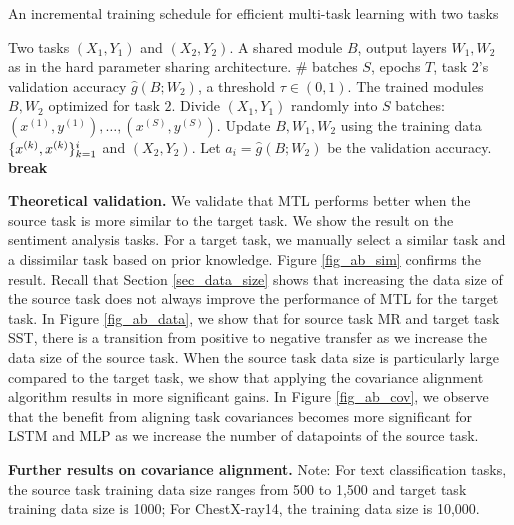 \begin{algorithm}[!h]
	\caption{An incremental training schedule for efficient multi-task learning with two tasks}
	\label{alg_inc_train}
	\begin{algorithmic}[1]
		\Input Two tasks $(X_1, Y_1)$ and $(X_2, Y_2)$.
		\Param A shared module $B$, output layers $W_1, W_2$ as in the hard parameter sharing architecture.
		\Req \# batches $S$, epochs $T$, task $2$'s validation accuracy $\hat{g}(B; W_2)$, a threshold $\tau\in(0,1)$.
		\Output The trained modules $B, W_2$ optimized for task $2$.
		\State Divide $(X_1, Y_1)$ randomly into $S$ batches: $(x^{(1)}, y^{(1)}), \dots, (x^{(S)}, y^{(S)})$.
				\State Update $B, W_1, W_2$ using the training data $\{x^{(k)}, x^{(k)}\}_{k=1}^i$ and  $(X_2, Y_2)$.
			\EndFor
			\State Let $a_i = \hat{g}(B; W_2)$ be the validation accuracy.
				\State \textbf{break}
			\EndIf
		\EndFor
	\end{algorithmic}
\end{algorithm}




\textbf{Theoretical validation.} We validate that MTL performs better when the source task is more similar to the target task.
We show the result on the sentiment analysis tasks.
For a target task, we manually select a similar task and a dissimilar task based on prior knowledge.
Figure \ref{fig_ab_sim} confirms the result.
Recall that Section \ref{sec_data_size} shows that increasing the data size of the source task does not always improve the performance of MTL for the target task.
In Figure \ref{fig_ab_data}, we show that for source task MR and target task SST, there is a transition from positive to negative transfer as we increase the data size of the source task.
When the source task data size is particularly large compared to the target task, we show that applying the covariance alignment algorithm results in more significant gains.
In Figure \ref{fig_ab_cov}, we observe that the benefit from aligning task covariances becomes more significant for LSTM and MLP as we increase the number of datapoints of the source task.


\textbf{Further results on covariance alignment.}
Note: For text classification tasks, the source task training data size ranges from 500 to 1,500 and target task training data size is 1000; For ChestX-ray14, the training data size is 10,000.

